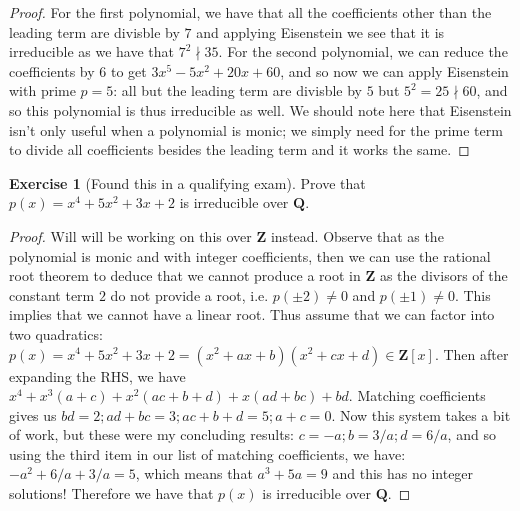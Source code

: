 \documentclass[9pt,reqno]{amsart}
\theoremstyle{definition}
\newtheorem{exercise}{Exercise}[section]
\newcommand{\zz}{\mathbf Z}
\newcommand{\qq}{\mathbf Q}
\begin{document}
\begin{proof}
	For the first polynomial, we have that all the coefficients other than the leading term are divisble by $7$ and applying Eisenstein we see that it is irreducible as we have that $7^2 \nmid 35$. For the second polynomial, we can reduce the coefficients by $6$ to get $3x^5
-5x^2 +20x+60$, and so now we can apply Eisenstein with prime $p=5$: all but the leading term are divisble by $5$ but $5^2 = 25 \nmid 60$, and so this polynomial is thus irreducible as well. We should note here that Eisenstein isn't only useful when a polynomial is monic; we simply need for the prime term to divide all coefficients besides the leading term and it works the same. 
\end{proof}
\begin{exercise}[Found this in a qualifying exam] Prove that $p(x) = x^4 + 5x^2 + 3x+2$ is irreducible over $\qq$.
	
\end{exercise}
\begin{proof}
	Will will be working on this over $\zz$ instead. Observe that as the polynomial is monic and with integer coefficients, then we can use the rational root theorem to deduce that we cannot produce a root in $\zz$ as the divisors of the constant term $2$ do not provide a root, i.e. $p(\pm 2) \neq 0$ and $p( \pm 1 )\neq 0$. This implies that we cannot have a linear root. Thus assume that we can factor into two quadratics: $p(x) = x^4 + 5x^2 + 3x+2 = (x^2 + ax+ b) (x^2 + cx + d) \in \zz[x]$. Then after expanding the RHS, we have $x^4 + x^3 (a+c) + x^2 (ac + b +d) + x(ad+bc) + bd$. Matching coefficients gives us $bd = 2; ad+bc  =3; ac+b+d = 5; a+c  = 0$. Now this system takes a bit of work, but these were my concluding results: $c= -a; b = 3/a ; d=6/a$, and so using the third item in our list of matching coefficients, we have: \\ $-a^2 +6/a + 3/a = 5$, which means that $a^3+5a = 9$ and this has no integer solutions! Therefore we have that $p(x)$ is irreducible over $\qq$. 
\end{proof} 
\end{document}
